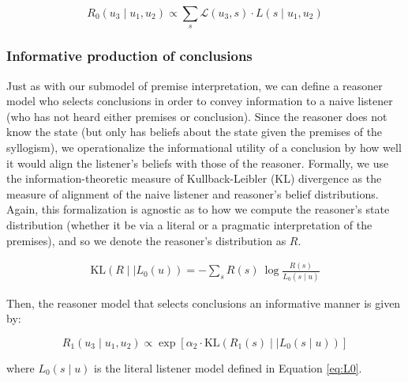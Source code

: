 \documentclass[floatsintext, doc]{apa6}
\begin{document}

\begin{equation}
R_0(u_3 \mid u_1, u_2) \propto \sum_s \mathcal{L}(u_3, s) \cdot L(s \mid u_1, u_2) \label{eq:R0}
\end{equation}

\subsubsection{Informative production of conclusions}

Just as with our submodel of premise interpretation, we can define a reasoner model who selects conclusions in order to convey information to a naive listener (who has not heard either premises or conclusion). 
Since the reasoner does not know the state (but only has beliefs about the state given the premises of the syllogism), we operationalize the informational utility of a conclusion by how well it would align the listener's beliefs with those of the reasoner. 
Formally, we use the information-theoretic measure of Kullback-Leibler (KL) divergence as the measure of alignment of the naive listener and reasoner's belief distributions. 
Again, this formalization is agnostic as to how we compute the reasoner's state distribution (whether it be via a literal or a pragmatic interpretation of the premises), and so we denote the reasoner's distribution as $R$.

\begin{align}
  \label{eq:KL-divergence}
  \text{KL}({R \mid \mid L_0}(u)) = - \sum_{s} R(s) \ \log \frac{R(s)}{{L_{0}}(s \mid u)}
\end{align}

\noindent Then, the reasoner model that selects conclusions an informative manner is given by: 

\begin{equation}
R_1(u_3 \mid u_1,  u_2) \propto  \exp [ \alpha_2 \cdot \text{KL}({R_1(s) \mid \mid L_0}(s \mid u)) ]  \label{eq:R1}
\end{equation}

\noindent where $L_0(s \mid u)$ is the literal listener model defined in Equation \ref{eq:L0}. 
\end{document}
